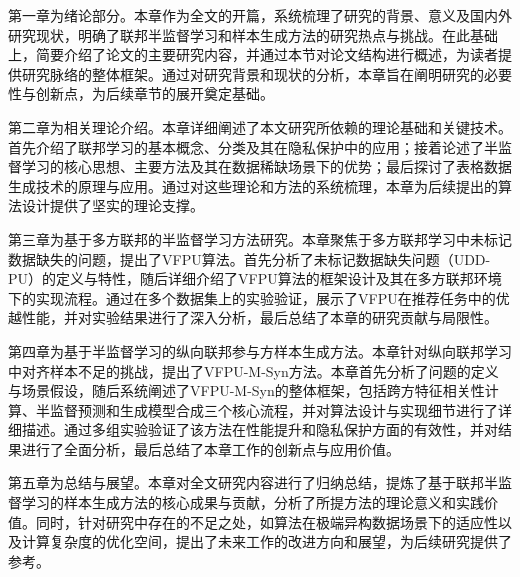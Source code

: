 第一章为绪论部分。本章作为全文的开篇，系统梳理了研究的背景、意义及国内外研究现状，明确了联邦半监督学习和样本生成方法的研究热点与挑战。在此基础上，简要介绍了论文的主要研究内容，并通过本节对论文结构进行概述，为读者提供研究脉络的整体框架。通过对研究背景和现状的分析，本章旨在阐明研究的必要性与创新点，为后续章节的展开奠定基础。

第二章为相关理论介绍。本章详细阐述了本文研究所依赖的理论基础和关键技术。首先介绍了联邦学习的基本概念、分类及其在隐私保护中的应用；接着论述了半监督学习的核心思想、主要方法及其在数据稀缺场景下的优势；最后探讨了表格数据生成技术的原理与应用。通过对这些理论和方法的系统梳理，本章为后续提出的算法设计提供了坚实的理论支撑。

第三章为基于多方联邦的半监督学习方法研究。本章聚焦于多方联邦学习中未标记数据缺失的问题，提出了VFPU算法。首先分析了未标记数据缺失问题（UDD-PU）的定义与特性，随后详细介绍了VFPU算法的框架设计及其在多方联邦环境下的实现流程。通过在多个数据集上的实验验证，展示了VFPU在推荐任务中的优越性能，并对实验结果进行了深入分析，最后总结了本章的研究贡献与局限性。

第四章为基于半监督学习的纵向联邦参与方样本生成方法。本章针对纵向联邦学习中对齐样本不足的挑战，提出了VFPU-M-Syn方法。本章首先分析了问题的定义与场景假设，随后系统阐述了VFPU-M-Syn的整体框架，包括跨方特征相关性计算、半监督预测和生成模型合成三个核心流程，并对算法设计与实现细节进行了详细描述。通过多组实验验证了该方法在性能提升和隐私保护方面的有效性，并对结果进行了全面分析，最后总结了本章工作的创新点与应用价值。

第五章为总结与展望。本章对全文研究内容进行了归纳总结，提炼了基于联邦半监督学习的样本生成方法的核心成果与贡献，分析了所提方法的理论意义和实践价值。同时，针对研究中存在的不足之处，如算法在极端异构数据场景下的适应性以及计算复杂度的优化空间，提出了未来工作的改进方向和展望，为后续研究提供了参考。
\clearpage

